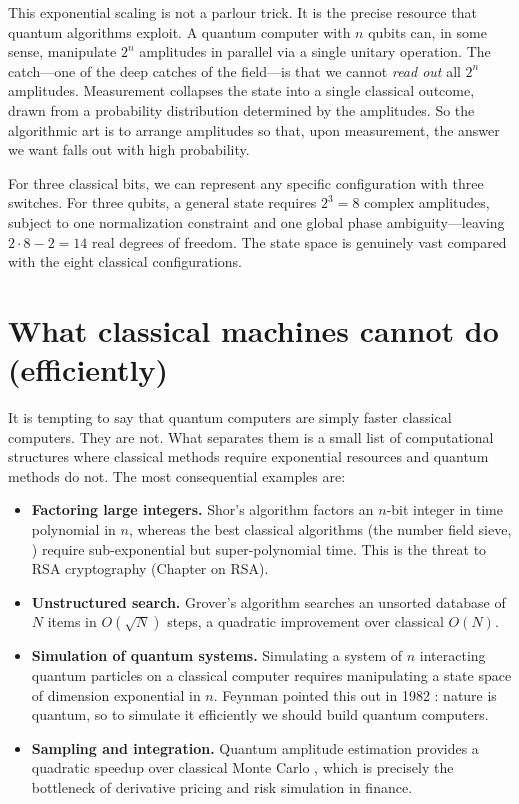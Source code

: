 This exponential scaling is not a parlour trick. It is the precise resource that quantum algorithms exploit. A quantum computer with $n$ qubits can, in some sense, manipulate $2^n$ amplitudes in parallel via a single unitary operation. The catch---one of the deep catches of the field---is that we cannot \emph{read out} all $2^n$ amplitudes. Measurement collapses the state into a single classical outcome, drawn from a probability distribution determined by the amplitudes. So the algorithmic art is to arrange amplitudes so that, upon measurement, the answer we want falls out with high probability.

\begin{example}
For three classical bits, we can represent any specific configuration with three switches. For three qubits, a general state requires $2^3=8$ complex amplitudes, subject to one normalization constraint and one global phase ambiguity---leaving $2\cdot 8 - 2 = 14$ real degrees of freedom. The state space is genuinely vast compared with the eight classical configurations.
\end{example}

\section{What classical machines cannot do (efficiently)}

It is tempting to say that quantum computers are simply faster classical computers. They are not. What separates them is a small list of computational structures where classical methods require exponential resources and quantum methods do not. The most consequential examples are:

\begin{itemize}
  \item \textbf{Factoring large integers.} Shor's algorithm \citep{shor_polynomial_1997} factors an $n$-bit integer in time polynomial in $n$, whereas the best classical algorithms (the number field sieve, \citep{lenstra_factoring_1993}) require sub-exponential but super-polynomial time. This is the threat to RSA cryptography (Chapter on RSA).
  \item \textbf{Unstructured search.} Grover's algorithm \citep{grover_fast_1996} searches an unsorted database of $N$ items in $O(\sqrt{N})$ steps, a quadratic improvement over classical $O(N)$.
  \item \textbf{Simulation of quantum systems.} Simulating a system of $n$ interacting quantum particles on a classical computer requires manipulating a state space of dimension exponential in $n$. Feynman pointed this out in 1982 \citep{feynman_simulating_1982}: nature is quantum, so to simulate it efficiently we should build quantum computers.
  \item \textbf{Sampling and integration.} Quantum amplitude estimation provides a quadratic speedup over classical Monte Carlo \citep{egger_quantum_2020}, which is precisely the bottleneck of derivative pricing and risk simulation in finance.
\end{itemize}


